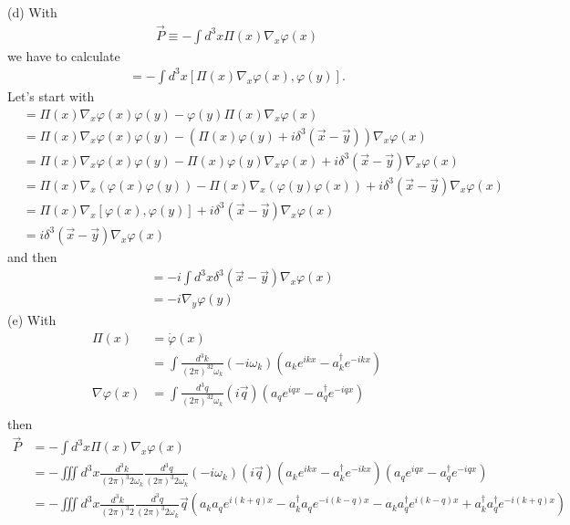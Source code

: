 \documentclass[10pt,a4paper]{book}
\theoremstyle{definition}
\begin{document}
(d) With
\begin{align}
\vec{P}\equiv-\int d^3x\Pi(x)\nabla_x\varphi(x)
\end{align}
we have to calculate
\begin{align}
[\vec{P},\varphi(y)]=-\int d^3x[\Pi(x)\nabla_x\varphi(x),\varphi(y)].
\end{align}
Let's start with
\begin{align}
[\Pi(x)\nabla_x\varphi(x),\varphi(y)]
&=\Pi(x)\nabla_x\varphi(x)\varphi(y)-\varphi(y)\Pi(x)\nabla_x\varphi(x)\\
&=\Pi(x)\nabla_x\varphi(x)\varphi(y)-(\Pi(x)\varphi(y)+i\delta^3(\vec{x}-\vec{y}))\nabla_x\varphi(x)\\
&=\Pi(x)\nabla_x\varphi(x)\varphi(y)-\Pi(x)\varphi(y)\nabla_x\varphi(x)+i\delta^3(\vec{x}-\vec{y})\nabla_x\varphi(x)\\
&=\Pi(x)\nabla_x(\varphi(x)\varphi(y))-\Pi(x)\nabla_x(\varphi(y)\varphi(x))+i\delta^3(\vec{x}-\vec{y})\nabla_x\varphi(x)\\
&=\Pi(x)\nabla_x[\varphi(x),\varphi(y)]+i\delta^3(\vec{x}-\vec{y})\nabla_x\varphi(x)\\
&=i\delta^3(\vec{x}-\vec{y})\nabla_x\varphi(x)
\end{align}
and then
\begin{align}
[\vec{P},\varphi(y)]
&=-i\int d^3x\delta^3(\vec{x}-\vec{y})\nabla_x\varphi(x)\\
&=-i\nabla_y\varphi(y)
\end{align}
(e) With
\begin{align}
\Pi(x)&=
\dot\varphi(x)\\
&=\int\frac{d^3k}{(2\pi)^32\omega_k}(-i\omega_k)(a_ke^{ikx}-a^\dagger_ke^{-ikx})\\
\nabla\varphi(x)
&=\int\frac{d^3q}{(2\pi)^32\omega_k}(i\vec{q})(a_qe^{iqx}-a^\dagger_qe^{-iqx})\\
\end{align}
then
\begin{align}
\vec{P}
&=-\int d^3x\Pi(x)\nabla_x\varphi(x)\\
&=-\iiint d^3x
\frac{d^3k}{(2\pi)^3 2\omega_k}
\frac{d^3q}{(2\pi)^3 2\omega_k}
(-i\omega_k)(i\vec{q})
(a_ke^{ikx}-a^\dagger_ke^{-ikx})
(a_qe^{iqx}-a^\dagger_qe^{-iqx})\\
&=-\iiint d^3x
\frac{d^3k}{(2\pi)^3 2}
\frac{d^3q}{(2\pi)^3 2\omega_k}\vec{q}
(a_ka_qe^{i(k+q)x}-a^\dagger_ka_qe^{-i(k-q)x}-
a_ka^\dagger_q e^{i(k-q)x}+a^\dagger_ka^\dagger_qe^{-i(k+q)x})\\
\end{align}
\end{document}
